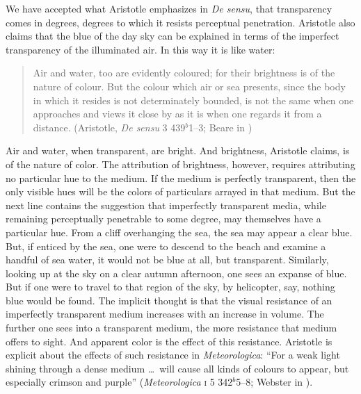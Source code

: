 We have accepted what Aristotle emphasizes in \emph{De sensu}, that transparency comes in degrees, degrees to which it resists perceptual penetration. Aristotle also claims that the blue of the day sky can be explained in terms of the imperfect transparency of the illuminated air. In this way it is like water:
\begin{quote}
    Air and water, too are evidently coloured; for their brightness is of the nature of colour. But the colour which air or sea presents, since the body in which it resides is not determinately bounded, is not the same when one approaches and views it close by as it is when one regards it from a distance. (Aristotle, \emph{De sensu} 3 439\( ^{b} \)1--3; Beare in \citealt[7]{Barnes:1984uq})
\end{quote}
Air and water, when transparent, are bright. And brightness, Aristotle claims, is of the nature of color. The attribution of brightness, however, requires attributing no particular hue to the medium. If the medium is perfectly transparent, then the only visible hues will be the colors of particulars arrayed in that medium. But the next line contains the suggestion that imperfectly transparent media, while remaining perceptually penetrable to some degree, may themselves have a particular hue. From a cliff overhanging the sea, the sea may appear a clear blue. But, if enticed by the sea, one were to descend to the beach and examine a handful of sea water, it would not be blue at all, but transparent. Similarly, looking up at the sky on a clear autumn afternoon, one sees an expanse of blue. But if one were to travel to that region of the sky, by helicopter, say, nothing blue would be found. The implicit thought is that the visual resistance of an imperfectly transparent medium increases with an increase in volume. The further one sees into a transparent medium, the more resistance that medium offers to sight. And apparent color is the effect of this resistance. Aristotle is explicit about the effects of such resistance in \emph{Meteorologica}: ``For a weak light shining through a dense medium \ldots\ will cause all kinds of colours to appear, but especially crimson and purple'' (\emph{Meteorologica} \textsc{i} 5 342\( ^{b} \)5--8; Webster in \citealt[8--9]{Barnes:1984uq}).

